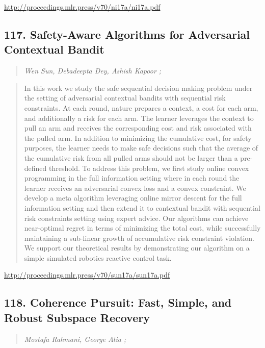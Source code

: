 \documentclass{article}
\begin{document}
\href{http://proceedings.mlr.press/v70/ni17a/ni17a.pdf}{http://proceedings.mlr.press/v70/ni17a/ni17a.pdf}

\subsection{117. Safety-Aware Algorithms for Adversarial Contextual Bandit}

\begin{quote}
\footnotesize{\textit{Wen Sun, Debadeepta Dey, Ashish Kapoor ;}}
\end{quote}

\begin{quote}
    In this work we study the safe sequential decision making problem under the setting of adversarial contextual bandits with sequential risk constraints. At each round, nature prepares a context, a cost for each arm, and additionally a risk for each arm. The learner leverages the context to pull an arm and receives the corresponding cost and risk associated with the pulled arm. In addition to minimizing the cumulative cost, for safety purposes, the learner needs to make safe decisions such that the average of the cumulative risk from all pulled arms should not be larger than a pre-defined threshold. To address this problem, we first study online convex programming in the full information setting where in each round the learner receives an adversarial convex loss and a convex constraint. We develop a meta algorithm leveraging online mirror descent for the full information setting and then extend it to contextual bandit with sequential risk constraints setting using expert advice. Our algorithms can achieve near-optimal regret in terms of minimizing the total cost, while successfully maintaining a sub-linear growth of accumulative risk constraint violation. We support our theoretical results by demonstrating our algorithm on a simple simulated robotics reactive control task.  \end{quote}

\href{http://proceedings.mlr.press/v70/sun17a/sun17a.pdf}{http://proceedings.mlr.press/v70/sun17a/sun17a.pdf}

\subsection{118. Coherence Pursuit: Fast, Simple, and Robust Subspace Recovery}

\begin{quote}
\footnotesize{\textit{Mostafa Rahmani, George Atia ;}}
\end{quote}
\end{document}

